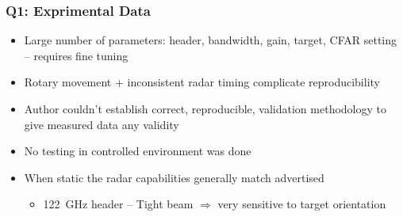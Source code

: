 \documentclass[aspectratio=43]{beamer}
\begin{document}
\begin{frame}[fragile]
  \frametitle{Q1: Exprimental Data}

  \begin{itemize}
    \item Large number of parameters: header, bandwidth, gain, target, CFAR setting -- requires fine tuning
		\item Rotary movement + inconsistent radar timing complicate reproducibility
    \item Author couldn't establish correct, reproducible, validation methodology to give measured data any validity
    \item No testing in controlled environment was done
    \item When static the radar capabilities generally match advertised
      \begin{itemize}
        \item 122~GHz header -- Tight beam $\Rightarrow$ very sensitive to target orientation
      \end{itemize}
  \end{itemize}
\end{frame}
\end{document}
